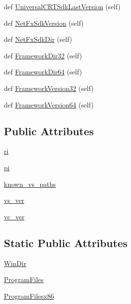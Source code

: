 \begin{DoxyCompactItemize}
\item 
def \hyperlink{classsetuptools_1_1msvc_1_1SystemInfo_adab24080174bef52de07fe5cb136a7e2}{Universal\+C\+R\+T\+Sdk\+Last\+Version} (self)
\item 
def \hyperlink{classsetuptools_1_1msvc_1_1SystemInfo_a6d388097caf3354628b82893e620bf6f}{Net\+Fx\+Sdk\+Version} (self)
\item 
def \hyperlink{classsetuptools_1_1msvc_1_1SystemInfo_ad0fbcce4995153fab005f15910fb30a6}{Net\+Fx\+Sdk\+Dir} (self)
\item 
def \hyperlink{classsetuptools_1_1msvc_1_1SystemInfo_ac293ac926386145b04dfc6d9c2b5e2e3}{Framework\+Dir32} (self)
\item 
def \hyperlink{classsetuptools_1_1msvc_1_1SystemInfo_acaec285668f9b2ff4305aaeb660a620a}{Framework\+Dir64} (self)
\item 
def \hyperlink{classsetuptools_1_1msvc_1_1SystemInfo_aad4f31f62e06a1c6c02435a47a85bfff}{Framework\+Version32} (self)
\item 
def \hyperlink{classsetuptools_1_1msvc_1_1SystemInfo_abbe972ff9d7ca0369260a4266a1c4671}{Framework\+Version64} (self)
\end{DoxyCompactItemize}
\subsection*{Public Attributes}
\begin{DoxyCompactItemize}
\item 
\hyperlink{classsetuptools_1_1msvc_1_1SystemInfo_ad6fde55784fa1753f5c8bee312e15afb}{ri}
\item 
\hyperlink{classsetuptools_1_1msvc_1_1SystemInfo_aa52b1e157302254714cd63a2b53b2819}{pi}
\item 
\hyperlink{classsetuptools_1_1msvc_1_1SystemInfo_a195f2ceb35ef51233f13be721a97bac8}{known\+\_\+vs\+\_\+paths}
\item 
\hyperlink{classsetuptools_1_1msvc_1_1SystemInfo_a6d496fdb5e0106231c304390d822a5ec}{vs\+\_\+ver}
\item 
\hyperlink{classsetuptools_1_1msvc_1_1SystemInfo_aaf63b691809f5893000733170c79d98d}{vc\+\_\+ver}
\end{DoxyCompactItemize}
\subsection*{Static Public Attributes}
\begin{DoxyCompactItemize}
\item 
\hyperlink{classsetuptools_1_1msvc_1_1SystemInfo_a25ba63d284f33a511bc4fe769d4ac319}{Win\+Dir}
\item 
\hyperlink{classsetuptools_1_1msvc_1_1SystemInfo_ad0a2055f68b0ca75bec12eea447cfd47}{Program\+Files}
\item 
\hyperlink{classsetuptools_1_1msvc_1_1SystemInfo_a7c6828f44a158ce0d0ab6f91127291ae}{Program\+Filesx86}
\end{DoxyCompactItemize}


